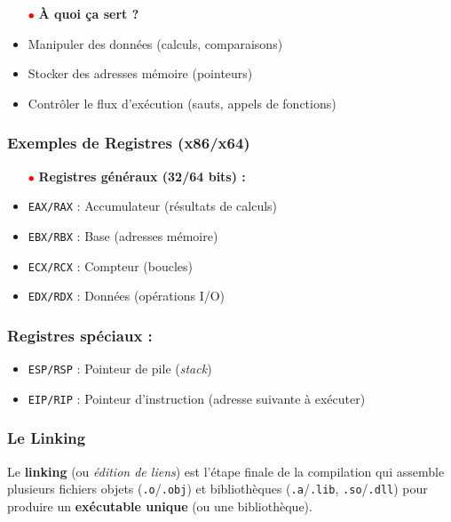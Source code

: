 \documentclass{article}
\begin{document}
\begin{itemize}
    \item[\textbf{\textcolor{red}{$\bullet$}}] \textbf{À quoi ça sert ?}
    \item Manipuler des données (calculs, comparaisons)
    \item Stocker des adresses mémoire (pointeurs)
    \item Contrôler le flux d'exécution (sauts, appels de fonctions)
\end{itemize}

\subsubsection*{Exemples de Registres (x86/x64)}
\begin{itemize}
    \item[\textbf{\textcolor{red}{$\bullet$}}] \textbf{Registres généraux (32/64 bits) :}
    \item \texttt{EAX/RAX} : Accumulateur (résultats de calculs)
    \item \texttt{EBX/RBX} : Base (adresses mémoire)
    \item \texttt{ECX/RCX} : Compteur (boucles)
    \item \texttt{EDX/RDX} : Données (opérations I/O)
\end{itemize}

\subsubsection*{Registres spéciaux :}
\begin{itemize}
    \item \texttt{ESP/RSP} : Pointeur de pile (\textit{stack})
    \item \texttt{EIP/RIP} : Pointeur d'instruction (adresse suivante à exécuter)
\end{itemize}


\subsubsection*{Le Linking}
\begin{figure}
    \label{fig:linking}
\end{figure}
Le \textbf{linking} (ou \textit{édition de liens}) est l'étape finale de la compilation qui assemble plusieurs fichiers objets (\texttt{.o}/\texttt{.obj}) et bibliothèques (\texttt{.a}/\texttt{.lib}, \texttt{.so}/\texttt{.dll}) pour produire un \textbf{exécutable unique} (ou une bibliothèque).
\end{document}
